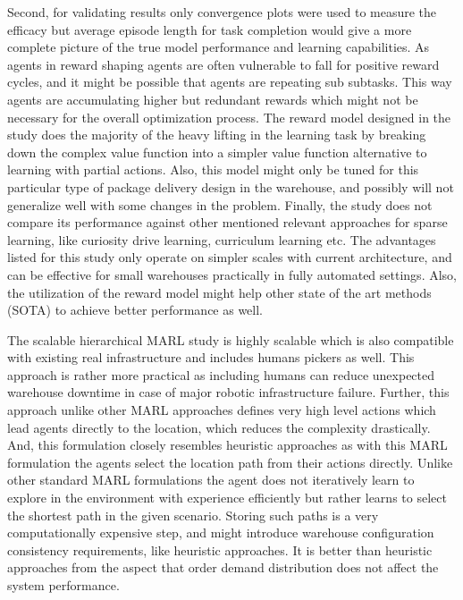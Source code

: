 \documentclass{article}
\begin{document}
Second, for validating results only convergence plots were used to measure the efficacy but average episode length for task completion would give a more complete picture of the true model performance and learning capabilities.
As agents in reward shaping agents are often vulnerable to fall for positive reward cycles, and it might be possible that agents are repeating sub subtasks.
This way agents are accumulating higher but redundant rewards which might not be necessary for the overall optimization process.
The reward model designed in the study does the majority of the heavy lifting in the learning task by breaking down the complex value function into a simpler value function alternative to learning with partial actions.
Also, this model might only be tuned for this particular type of package delivery design in the warehouse, and possibly will not generalize well with some changes in the problem.
Finally, the study does not compare its performance against other mentioned relevant approaches for sparse learning, like curiosity drive learning, curriculum learning etc.
The advantages listed for this study only operate on simpler scales with current architecture, and can be effective for small warehouses practically in fully automated settings. Also, the utilization of the reward model might help other state of the art methods (SOTA) to achieve better performance as well.


The scalable hierarchical MARL study is highly scalable which is also compatible with existing real infrastructure and includes humans pickers as well.
This approach is rather more practical as including humans can reduce unexpected warehouse downtime in case of major robotic infrastructure failure.
Further, this approach unlike other MARL approaches defines very high level actions which lead agents directly to the location, which reduces the complexity drastically.
And, this formulation closely resembles heuristic approaches as with this MARL formulation the agents select the location path from their actions directly.
Unlike other standard MARL formulations the agent does not iteratively learn to explore in the environment with experience efficiently but rather learns to select the shortest path in the given scenario.
Storing such paths is a very computationally expensive step, and might introduce warehouse configuration consistency requirements, like heuristic approaches.
It is better than heuristic approaches from the aspect that order demand distribution does not affect the system performance.
\end{document}
